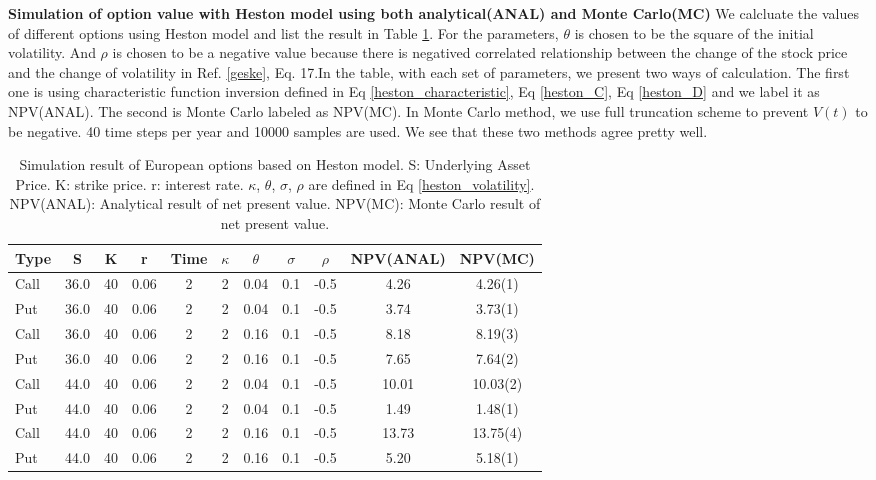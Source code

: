\documentclass[a4paper]{article}
\begin{document}
{\bf Simulation of option value with Heston model using both analytical(ANAL) and Monte Carlo(MC)} We calcluate the values of different options using Heston model and list
 the result in Table \ref{option_heston}. For the parameters, $\theta$ is chosen to be the square of the initial volatility. And $\rho$ is chosen to be a negative value because there is negatived correlated relationship between the change of the stock price and the change of volatility in Ref. \ref{geske}, Eq. 17.In the table, with each set of parameters, we present two ways of calculation. The first one is using characteristic function inversion defined in Eq \ref{heston_characteristic}, Eq \ref{heston_C}, Eq \ref{heston_D} and we label it as NPV(ANAL). The second is Monte Carlo labeled as NPV(MC). In Monte Carlo method, we use full truncation scheme to prevent $V(t)$ to be negative. 40 time steps per year and 10000 samples are used. We see that these two methods agree pretty well.

\begin{table}
	\begin{tabular} { l    c c  c  c  c    c c c    c       c          }
		 Type & S  & K & r& Time & $\kappa$& $\theta$ & $\sigma$ & $\rho$ & NPV(ANAL) & NPV(MC) \\
	\hline 
		 Call & 36.0 & 40 & 0.06&   2 &  2 &  0.04  & 0.1& -0.5 & 4.26 & 4.26(1)  \\
		 Put  & 36.0 & 40 & 0.06&   2 &  2 &  0.04  & 0.1& -0.5 & 3.74 & 3.73(1) \\
		 Call & 36.0 & 40 & 0.06&   2 &  2 &  0.16  & 0.1& -0.5 & 8.18 & 8.19(3) \\
		 Put  & 36.0 & 40 & 0.06&   2 &  2 &  0.16  & 0.1& -0.5 & 7.65 & 7.64(2) \\
		 Call & 44.0 & 40 & 0.06&   2 &  2 &  0.04  & 0.1& -0.5 & 10.01 & 10.03(2) \\
		 Put  & 44.0 & 40 & 0.06&   2 &  2 &  0.04  & 0.1& -0.5 & 1.49 & 1.48(1) \\
		 Call & 44.0 & 40 & 0.06&   2 &  2 &  0.16  & 0.1& -0.5 & 13.73 & 13.75(4) \\
		 Put  & 44.0 & 40 & 0.06&   2 &  2 &  0.16  & 0.1& -0.5 & 5.20 &  5.18(1)\\
	\hline
	\end{tabular}\\
\caption{Simulation result of European options based on Heston model.
	S: Underlying Asset Price. K: strike price. r: interest rate. $\kappa$, $\theta$, $\sigma$, $\rho$ are defined in Eq \ref{heston_volatility}.
	 NPV(ANAL): Analytical result of net present value.
	NPV(MC): Monte Carlo result of net present value.}\label{option_heston}
\end{table}
\appendix
\end{document}
